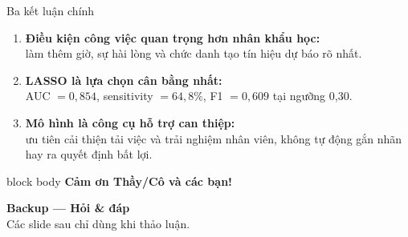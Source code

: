 \documentclass[10pt,aspectratio=169]{beamer}
\begin{document}
\begin{frame}{Ba kết luận chính}
  \vspace{0.18cm}
  \begin{enumerate}
    \item \textbf{Điều kiện công việc quan trọng hơn nhân khẩu học:}\\
          làm thêm giờ, sự hài lòng và chức danh tạo tín hiệu dự báo rõ nhất.
    \vspace{0.28cm}
    \item \textbf{LASSO là lựa chọn cân bằng nhất:}\\
          AUC \(=0,854\), sensitivity \(=64,8\%\), F1 \(=0,609\) tại
          ngưỡng 0,30.
    \vspace{0.28cm}
    \item \textbf{Mô hình là công cụ hỗ trợ can thiệp:}\\
          ưu tiên cải thiện tải việc và trải nghiệm nhân viên, không tự
          động gắn nhãn hay ra quyết định bất lợi.
  \end{enumerate}

  \vfill
  \begin{beamercolorbox}[sep=0.18cm,center,rounded=true]{block body}
    {\Large\bfseries\color{HCMUSBlue}Cảm ơn Thầy/Cô và các bạn!}
  \end{beamercolorbox}
\end{frame}

\appendix

\begin{frame}[plain]
  \vfill\centering
  {\Large\bfseries\color{HCMUSBlue} Backup --- Hỏi \& đáp}\\[0.25cm]
  {\small\color{MutedText} Các slide sau chỉ dùng khi thảo luận.}
  \vfill
\end{frame}
\end{document}
